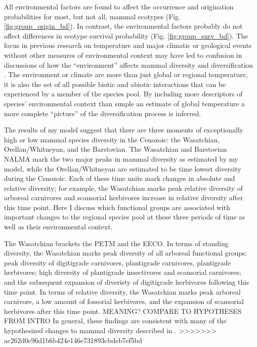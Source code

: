\documentclass[12pt,letterpaper]{article}
\begin{document}
All environmental factors are found to affect the occurrence and origination probabilities for most, but not all, mammal ecotypes (Fig. \ref{fig:group_origin_bd}). In contrast, the environmental factors probably do not affect differences in ecotype survival probability (Fig. \ref{fig:group_surv_bd}). The focus in previous research on temperature and major climatic or geological events without other measures of environmental context may have led to confusion in discussions of how the ``environment'' affects mammal diversity and diversification \citep{Alroy2000g,Figueirido2012}. The environment or climate are more than just global or regional temperature, it is also the set of all possible biotic and abiotic interactions that can be experienced by a member of the species pool. By including more descriptors of species' environmental context than simple an estimate of global temperature a more complete ``picture'' of the diversification process is inferred.



The results of my model suggest that there are three moments of exceptionally high or low mammal species diversity in the Cenozoic: the Wasatchian, Orellan/Whitneyan, and the Barstovian. The Wasatchian and Barstovian NALMA mark the two major peaks in mammal diversity as estimated by my model, while the Orellan/Whitneyan are estimated to be time lowest diversity during the Cenozoic. Each of these time units mark changes in absolute and relative diversity; for example, the Wasatchian marks peak relative diversity of arboreal carnivores and scansorial herbivores increase in relative diversity after this time point. Here I discuss which functional groups are associated with important changes to the regional species pool at these three periods of time as well as their environmental context.


The Wasatchian brackets the PETM and the EECO. In terms of standing diversity, the Wasatchian marks peak diversity of all arboreal functional groups; peak diversity of digitigrade carnivores, plantigrade carnivores, plantigrade herbivores; high diversity of plantigrade insectivores and scansorial carnivores; and the subsequent expansion of diveristy of digitigrade herbivores following this time point. In terms of relative diversity, the Wasatchian marks peak arboreal carnivore, a low amount of fossorial herbivores, and the expansion of scansorial herbivores after this time point. \uppercase{meaning? compare to hypotheses from intro}
In general, these findings are consistent with many of the hypothesized changes to mammal diversity described in \citet{Woodburne2009}.
>>>>>>> ac262d0c96d1b6b424e146e731893cbdeb7ef5bd
\end{document}
